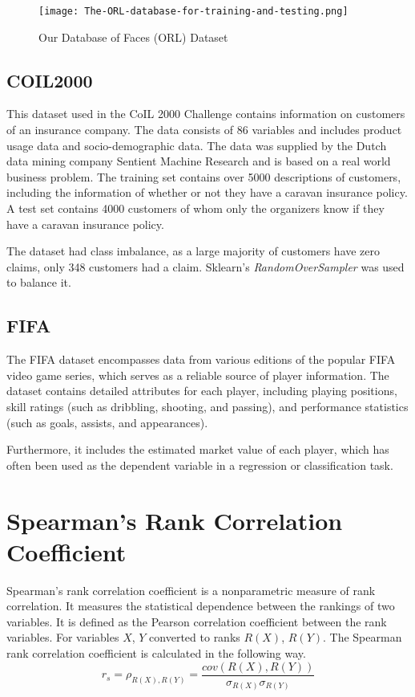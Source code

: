 \begin{figure}
    \centering
    \texttt{[image: The-ORL-database-for-training-and-testing.png]}
    \caption{Our Database of Faces (ORL) Dataset}
    \label{fig:orl_faces}
\end{figure}

\subsection{COIL2000}\label{section:coil-dataset}
This dataset used in the CoIL 2000 Challenge contains information on customers of an insurance company. The data consists of 86 variables and includes product usage data and socio-demographic data. The data was supplied by the Dutch data mining company Sentient Machine Research and is based on a real world business problem. The training set contains over 5000 descriptions of customers, including the information of whether or not they have a caravan insurance policy. A test set contains 4000 customers of whom only the organizers know if they have a caravan insurance policy.

The dataset had class imbalance, as a large majority of customers have zero claims, only 348 customers had a claim. Sklearn's \textit{RandomOverSampler} was used to balance it.

\subsection{FIFA}\label{section:fifa-dataset}
The FIFA dataset encompasses data from various editions of the popular FIFA video game series, which serves as a reliable source of player information. The dataset contains detailed attributes for each player, including playing positions, skill ratings (such as dribbling, shooting, and passing), and performance statistics (such as goals, assists, and appearances).

Furthermore, it includes the estimated market value of each player, which has often been used as the dependent variable in a regression or classification task.

\section{Spearman's Rank Correlation Coefficient} \label{section:spearman}
Spearman's rank correlation coefficient is a nonparametric measure of rank correlation. It measures the statistical dependence between the rankings of two variables. It is defined as the Pearson correlation coefficient between the rank variables. For variables $X$, $Y$ converted to ranks $R(X)$, $R(Y)$. The Spearman rank correlation coefficient is calculated in the following way.
\begin{equation}
    r_s = \rho_{R(X), R(Y)} = \frac{cov(R(X),R(Y))}{\sigma_{R(X)} \sigma_{R(Y)}}
\end{equation}


